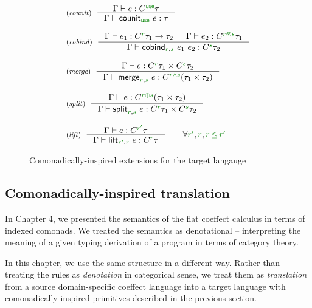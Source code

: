 \begin{figure}[t]
\begin{equation*}
\begin{array}{l}
\tyrule{counit}
  {\Gamma \vdash e : \ctyp{\cunit}{\tau}}
  {\Gamma \vdash \ident{counit}_{\cunit}~e : \tau} \\
\\
\tyrule{cobind}
  {\Gamma \vdash e_1 : \ctyp{\cclrd{r}}{\tau_1} \rightarrow \tau_2 & \Gamma \vdash e_2 : \ctyp{\cclrd{r}\cseq\cclrd{s}}{\tau_1} }
  {\Gamma \vdash \ident{cobind}_{\cclrd{r}, \cclrd{s}}~e_1~e_2 : \ctyp{\cclrd{s}}{\tau_2}} \\
  \\
\tyrule{merge}
  {\Gamma \vdash  e : \ctyp{\cclrd{r}}{\tau_1} \times \ctyp{\cclrd{s}}{\tau_2} } 
  {\Gamma \vdash  \ident{merge}_{\cclrd{r},\cclrd{s}}~e : \ctyp{\cclrd{r}\czip\cclrd{s}}{(\tau_1 \times \tau_2)} }\\
    \\
\tyrule{split}
  {\Gamma \vdash  e : \ctyp{\cclrd{r}\cpar\cclrd{s}}{(\tau_1 \times \tau_2)} }
  {\Gamma \vdash  \ident{split}_{\cclrd{r},\cclrd{s}}~e : \ctyp{\cclrd{r}}{\tau_1} \times \ctyp{\cclrd{s}}{\tau_2}} \\
\\
\tyrule{lift}
  {\Gamma \vdash  e : \ctyp{\cclrd{r'}}{\tau} }
  {\Gamma \vdash \ident{lift}_{\cclrd{r'},\cclrd{r}}~e : \ctyp{\cclrd{r}}{\tau} } \qquad\forall \cclrd{r'},\cclrd{r}, \cclrd{r}\,\cleq\,\cclrd{r'}
\\
\end{array}
\end{equation*}

\caption{Comonadically-inspired extensions for the target langauge}
\label{fig:transl-ext}
\end{figure}


\subsection{Comonadically-inspired translation}

In Chapter 4, we presented the semantics of the flat coeffect calculus in terms of indexed comonads.
We treated the semantics as denotational -- interpreting the meaning of a given typing derivation
of a program in terms of category theory.

In this chapter, we use the same structure in a different way. Rather than treating the rules as
\emph{denotation} in categorical sense, we treat them as \emph{translation} from a source 
domain-specific coeffect language into a target language with comonadically-inspired primitives
described in the previous section.

